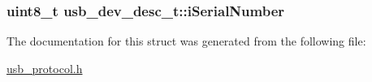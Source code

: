 \label{structusb__dev__desc__t_a2b7a0e3e8fc29da7fb47dbeb507556ad}
\hypertarget{structusb__dev__desc__t_aada14a1b1dd2a396544624c21ed84291}{
\subsubsection[{i\-Serial\-Number}]{\setlength{\rightskip}{0pt plus 5cm}uint8\-\_\-t {\bf usb\-\_\-dev\-\_\-desc\-\_\-t\-::i\-Serial\-Number}}}
\label{structusb__dev__desc__t_aada14a1b1dd2a396544624c21ed84291}


\-The documentation for this struct was generated from the following file\-:\begin{DoxyCompactItemize}
\item 
\hyperlink{usb__protocol_8h}{usb\-\_\-protocol.\-h}\end{DoxyCompactItemize}
